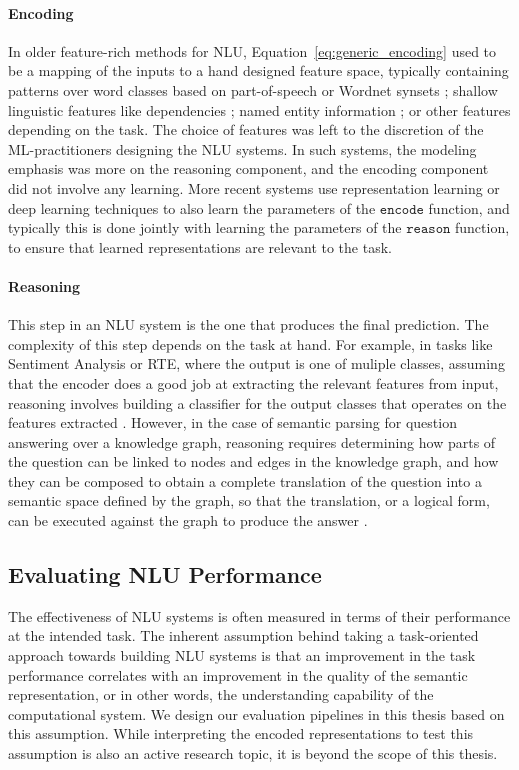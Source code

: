 \paragraph{Encoding} In older feature-rich methods for NLU, 
Equation~\ref{eq:generic_encoding} used to be a mapping of the inputs to a hand designed feature space, typically containing patterns over word classes based on
part-of-speech \citep{corley2005measuring} or Wordnet synsets \citep{moldovan2001logic}; shallow linguistic features like dependencies \citep{bos2005recognising};
named entity information \citep{tatu2005semantic}; or other features depending on the task. The choice of features was left to the discretion of the ML-practitioners
designing the NLU systems. In such systems, the modeling emphasis was more on the reasoning component, and the encoding component did not involve any learning. 
More recent systems \citep[among many others]{bahdanau:14,weston2014memory,hermann2015teaching,Xiong2016DynamicMN,bowman2016fast,yang:16} 
use representation learning or deep learning techniques to also learn the parameters of the
$\mathtt{encode}$ function, and typically this is done jointly with learning the parameters of the $\mathtt{reason}$ function, to ensure that learned representations are relevant to the task.

\paragraph{Reasoning} This step in an NLU system is the one that produces the final prediction. The complexity of this step depends on the task at hand.
For example, in tasks like Sentiment Analysis or RTE, where the output is one of muliple classes, assuming that the encoder does a good job at extracting the relevant features from input,
reasoning involves building a classifier for the output classes that operates on the features extracted \citep{pang2002thumbs}. However, in the case of semantic parsing for question answering over a knowledge graph, reasoning requires determining how parts of the question can be linked to
nodes and edges in the knowledge graph, and how they can be composed to obtain a complete translation of the question into a semantic space defined by the graph,
so that the translation, or a logical form, can be executed against the graph to produce the answer \citep{Zettlemoyer2005LearningTM}.

\subsection{Evaluating NLU Performance}
The effectiveness of NLU systems is often measured in terms of their
performance at the intended task. The inherent assumption behind taking a task-oriented approach
towards building NLU systems is that an improvement in the task performance correlates with an improvement in the quality of the semantic representation,
or in other words, the understanding capability of the computational system.
We design our evaluation pipelines in this thesis based on this assumption. While interpreting the encoded
representations to test this assumption is also an active research topic, it is beyond the scope of this thesis.

